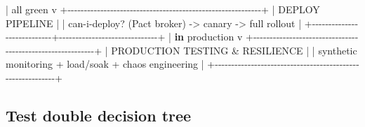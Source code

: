 \documentclass[11pt]{article}
\newenvironment{Shaded}{\begin{snugshade}}{\end{snugshade}}
\newcommand{\BuiltInTok}[1]{\textcolor[rgb]{0.50,0.55,0.55}{#1}}
\newcommand{\KeywordTok}[1]{\textcolor[rgb]{0.81,0.81,0.76}{\textbf{#1}}}
\newcommand{\NormalTok}[1]{\textcolor[rgb]{0.81,0.81,0.76}{#1}}
\newcommand{\OperatorTok}[1]{\textcolor[rgb]{0.81,0.81,0.76}{#1}}
\begin{document}
\begin{Shaded}
\begin{Highlighting}[]
                                \OperatorTok{|} \BuiltInTok{all}\NormalTok{ green}
\NormalTok{                                v}
   \OperatorTok{+{-}{-}{-}{-}{-}{-}{-}{-}{-}{-}{-}{-}{-}{-}{-}{-}{-}{-}{-}{-}{-}{-}{-}{-}{-}{-}{-}{-}{-}{-}{-}{-}{-}{-}{-}{-}{-}{-}{-}{-}{-}{-}{-}{-}{-}{-}{-}{-}{-}{-}{-}{-}{-}{-}{-}{-}{-}{-}{-}+}
   \OperatorTok{|}\NormalTok{                       DEPLOY PIPELINE                      }\OperatorTok{|}
   \OperatorTok{|}\NormalTok{  can}\OperatorTok{{-}}\NormalTok{i}\OperatorTok{{-}}\NormalTok{deploy? (Pact broker)  }\OperatorTok{{-}\textgreater{}}\NormalTok{  canary  }\OperatorTok{{-}\textgreater{}}\NormalTok{  full rollout }\OperatorTok{|}
   \OperatorTok{+{-}{-}{-}{-}{-}{-}{-}{-}{-}{-}{-}{-}{-}{-}{-}{-}{-}{-}{-}{-}{-}{-}{-}{-}{-}{-}{-}{-}+{-}{-}{-}{-}{-}{-}{-}{-}{-}{-}{-}{-}{-}{-}{-}{-}{-}{-}{-}{-}{-}{-}{-}{-}{-}{-}{-}{-}{-}{-}+}
                                \OperatorTok{|} \KeywordTok{in}\NormalTok{ production}
\NormalTok{                                v}
   \OperatorTok{+{-}{-}{-}{-}{-}{-}{-}{-}{-}{-}{-}{-}{-}{-}{-}{-}{-}{-}{-}{-}{-}{-}{-}{-}{-}{-}{-}{-}{-}{-}{-}{-}{-}{-}{-}{-}{-}{-}{-}{-}{-}{-}{-}{-}{-}{-}{-}{-}{-}{-}{-}{-}{-}{-}{-}{-}{-}{-}{-}+}
   \OperatorTok{|}\NormalTok{              PRODUCTION TESTING }\OperatorTok{\&}\NormalTok{ RESILIENCE              }\OperatorTok{|}
   \OperatorTok{|}\NormalTok{  synthetic monitoring  }\OperatorTok{+}\NormalTok{  load}\OperatorTok{/}\NormalTok{soak  }\OperatorTok{+}\NormalTok{  chaos engineering  }\OperatorTok{|}
   \OperatorTok{+{-}{-}{-}{-}{-}{-}{-}{-}{-}{-}{-}{-}{-}{-}{-}{-}{-}{-}{-}{-}{-}{-}{-}{-}{-}{-}{-}{-}{-}{-}{-}{-}{-}{-}{-}{-}{-}{-}{-}{-}{-}{-}{-}{-}{-}{-}{-}{-}{-}{-}{-}{-}{-}{-}{-}{-}{-}{-}{-}+}
\end{Highlighting}
\end{Shaded}

\subsection{Test double decision tree}\label{test-double-decision-tree}

\end{document}

